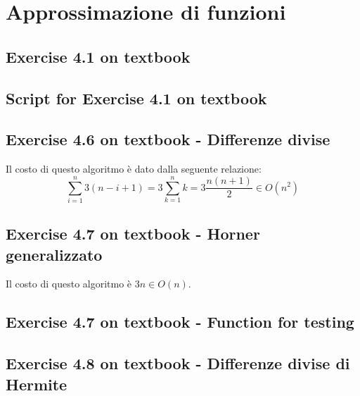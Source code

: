 \section{Approssimazione di funzioni}

\subsection{Exercise 4.1 on textbook}
\label{subsec:exercise41}
 

\subsection{Script for Exercise 4.1 on textbook}
\label{subsec:scriptForExercise41}


\subsection{Exercise 4.6 on textbook - Differenze divise}
\label{subsec:differenzeDiviseEngineCode}

Il costo di questo algoritmo \`e dato dalla seguente relazione:
\begin{displaymath}
\sum_{i = 1}^{n}{3(n-i+1)} = 3\sum_{k = 1}^{n}{k} = 3\frac{n(n+1)}{2} \in
O(n^{2})
\end{displaymath} 

\subsection{Exercise 4.7 on textbook - Horner generalizzato}
\label{subsec:HornerGeneralizzato}
  
Il costo di questo algoritmo \`e $3n \in O(n)$.

\subsection{Exercise 4.7 on textbook - Function for testing}
\label{subsec:exercise47testing}
 

\subsection{Exercise 4.8 on textbook - Differenze divise di Hermite}
\label{subsec:hermiteDifferenzeDiviseEngineCode}


